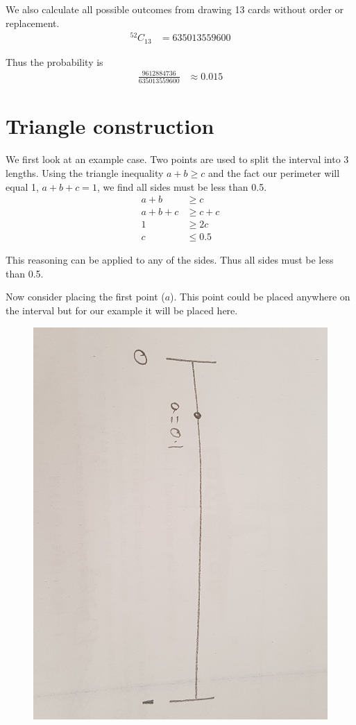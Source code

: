 \documentclass{article}
\begin{document}
We also calculate all possible outcomes from drawing 13 cards without order or
replacement.
\begin{align*}
    ^{52}C_{13} &= 635013559600
\end{align*}

Thus the probability is
\begin{align*}
    \frac{9612884736}{635013559600} &\approx 0.015
\end{align*}

\section{Triangle construction}
We first look at an example case.
Two points are used to split the interval into 3 lengths. Using the triangle
inequality $a + b \geq c$ and the fact our perimeter will equal 1,
$a + b + c = 1$, we find all sides must be less than 0.5.
\begin{align*}
    a + b &\geq c \\
    a + b + c &\geq c + c \\
    1 &\geq 2c \\
    c &\leq 0.5
\end{align*}

This reasoning can be applied to any of the sides. Thus all sides must be less
than 0.5.

Now consider placing the first point ($a$). This point could be placed anywhere
on the interval but for our example it will be placed here.
\begin{figure}[H]
    \centering
    \includegraphics[width=5in]{a.jpg}
\end{figure}
\end{document}
